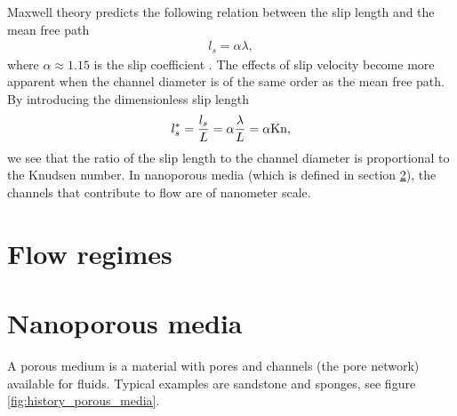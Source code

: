 Maxwell theory predicts the following relation between the slip length and the mean free path
\begin{align}
	\label{eq:noslip_sliplength}
	l_s = \alpha \lambda,
\end{align}
where $\alpha\approx 1.15$ is the slip coefficient \cite{morris1992slip}. The effects of slip velocity become more apparent when the channel diameter is of the same order as the mean free path. By introducing the dimensionless slip length
\begin{align}
	l_s^* = {l_s\over L} = \alpha {\lambda \over L} = \alpha \text{Kn},
\end{align}
we see that the ratio of the slip length to the channel diameter is proportional to the Knudsen number. In nanoporous media (which is defined in section \ref{sec:nanoporous_media}), the channels that contribute to flow are of nanometer scale.
\section{Flow regimes}
\section{Nanoporous media}
\label{sec:nanoporous_media}
A porous medium is a material with pores and channels (the pore network) available for fluids. Typical examples are sandstone and sponges, see figure \ref{fig:history_porous_media}. 
